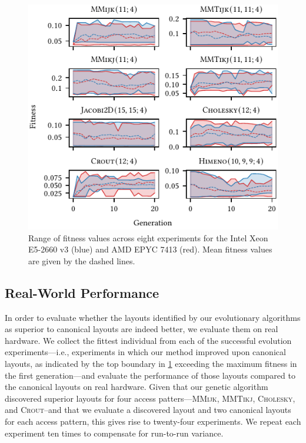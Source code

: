 \begin{figure}
    \centering
    \includegraphics{figures/fitness_evolution.pdf}
    \caption{Range of fitness values across eight experiments for the Intel Xeon E5-2660 v3 (blue) and AMD EPYC 7413 (red). Mean fitness values are given by the dashed lines.}
    \label{fig:fitness_evolution}
\end{figure}

\subsection{Real-World Performance}

\label{sec:results:real-world}

In order to evaluate whether the layouts identified by our evolutionary algorithms as superior to canonical layouts are indeed better, we evaluate them on real hardware. We collect the fittest individual from each of the successful evolution experiments---i.e., experiments in which our method improved upon canonical layouts, as indicated by the top boundary in \cref{fig:fitness_evolution} exceeding the maximum fitness in the first generation---and evaluate the performance of those layouts compared to the canonical layouts on real hardware. Given that our genetic algorithm discovered superior layouts for four access patters---\textsc{MMijk}, \textsc{MMTikj}, \textsc{Cholesky}, and \textsc{Crout}--and that we evaluate a discovered layout and two canonical layouts for each access pattern, this gives rise to twenty-four experiments. We repeat each experiment ten times to compensate for run-to-run variance.

